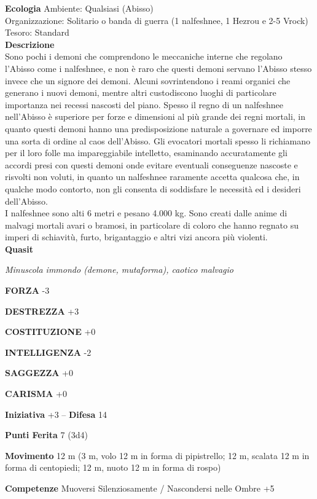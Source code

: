 \begin{multicols}{2}
\textbf{Ecologia}
Ambiente: Qualsiasi (Abisso)\\
Organizzazione: Solitario o banda di guerra (1 nalfeshnee, 1 Hezrou e 2-5 Vrock)\\
Tesoro: Standard\\
\textbf{Descrizione}\\
Sono pochi i demoni che comprendono le meccaniche interne che regolano l'Abisso come i nalfeshnee, e non è raro che questi demoni servano l'Abisso stesso invece che un signore dei demoni. Alcuni sovrintendono i reami organici che generano i nuovi demoni, mentre altri custodiscono luoghi di particolare importanza nei recessi nascosti del piano. Spesso il regno di un nalfeshnee nell'Abisso è superiore per forze e dimensioni al più grande dei regni mortali, in quanto questi demoni hanno una predisposizione naturale a governare ed imporre una sorta di ordine al caos dell'Abisso. Gli evocatori mortali spesso li richiamano per il loro folle ma impareggiabile intelletto, esaminando accuratamente gli accordi presi con questi demoni onde evitare eventuali conseguenze nascoste e risvolti non voluti, in quanto un nalfeshnee raramente accetta qualcosa che, in qualche modo contorto, non gli consenta di soddisfare le necessità ed i desideri dell'Abisso.\\
I nalfeshnee sono alti 6 metri e pesano 4.000 kg. Sono creati dalle anime di malvagi mortali avari o bramosi, in particolare di coloro che hanno regnato su imperi di schiavitù, furto, brigantaggio e altri vizi ancora più violenti.\\


\medskip{}\textbf{Quasit}

\emph{Minuscola immondo (demone, mutaforma), caotico malvagio}

\textbf{FORZA} -3

\textbf{DESTREZZA} +3

\textbf{COSTITUZIONE} +0

\textbf{INTELLIGENZA} -2

\textbf{SAGGEZZA} +0

\textbf{CARISMA} +0

\textbf{Iniziativa} +3 -- \textbf{Difesa} 14

\textbf{Punti Ferita} 7 (3d4)

\textbf{Movimento} 12 m (3 m, volo 12 m in forma di pipistrello; 12 m, scalata 12 m in forma di centopiedi; 12 m, nuoto 12 m in forma di rospo)

\textbf{Competenze} Muoversi Silenziosamente / Nascondersi nelle Ombre +5


\end{multicols}
